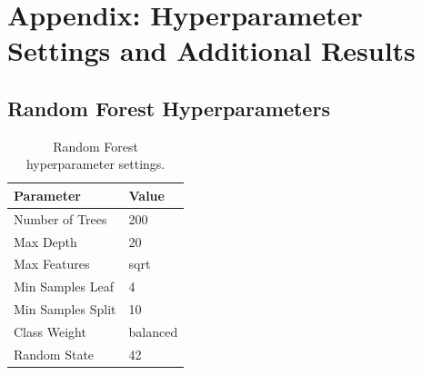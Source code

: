 \documentclass{article}
\begin{document}
\newpage
\appendix

\section{Appendix: Hyperparameter Settings and Additional Results}

\subsection{Random Forest Hyperparameters}
\begin{table}[ht]
    \centering
    \begin{tabular}{ll}
        \toprule
        Parameter             & Value \\
        \midrule
        Number of Trees       & 200 \\
        Max Depth             & 20 \\
        Max Features          & sqrt \\
        Min Samples Leaf      & 4 \\
        Min Samples Split     & 10 \\
        Class Weight          & balanced \\
        Random State          & 42 \\
        \bottomrule
    \end{tabular}
    \caption{Random Forest hyperparameter settings.}
\end{table}
\end{document}
